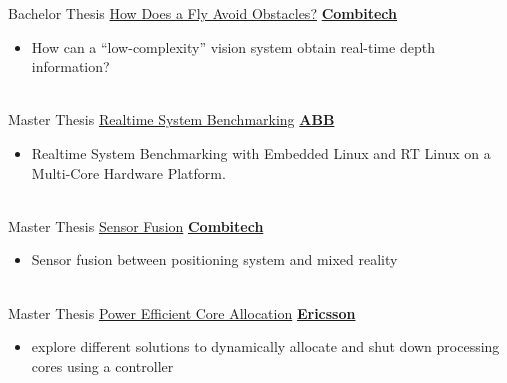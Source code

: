 \documentclass[letterpaper]{DS_class_file} %
\begin{document}
\begin{twenty} %
    
	\twentyitem
	{Bachelor}
	{Thesis}
    	{\hspace{0.3cm}\href{https://liu.diva-portal.org/smash/get/diva2:1678722/FULLTEXT01.pdf}{How Does a Fly Avoid Obstacles?}}
	{\href{https://www.combitech.se/}{\textbf{Combitech}}}
	{}
	{
		{\begin{itemize}
				\item How can a “low-complexity” vision system obtain real-time depth information?
		\end{itemize}}
	}
	\\
 \twentyitem
	{Master}
	{Thesis}
	{\hspace{0.3cm}\href{}{Realtime System Benchmarking}}
	{\href{https://new.abb.com/se/}{\textbf{ABB}}}
	{}
	{
		{\begin{itemize}
				\item Realtime System Benchmarking with Embedded Linux and RT Linux on a Multi-Core Hardware Platform.
		\end{itemize}}
	}
	\\

 \twentyitem
	{Master}
	{Thesis}
	{\hspace{0.3cm}\href{https://liu.diva-portal.org/smash/get/diva2:1709805/FULLTEXT01.pdf}{Sensor Fusion}}
	{\href{https://www.combitech.se/}{\textbf{Combitech}}}
	{}
	{
		{\begin{itemize}
				\item Sensor fusion between positioning system and mixed reality
		\end{itemize}}
	}
	\\

 \twentyitem
	{Master}
	{Thesis}
	{\hspace{0.3cm}\href{}{Power Efficient Core Allocation}}
	{\href{https://www.ericsson.com/en/about-us/company-facts/ericsson-worldwide/sweden/}{\textbf{Ericsson}}}
	{}
	{
		{\begin{itemize}
				\item explore different solutions to dynamically allocate and shut down processing cores using a controller
		\end{itemize}}
	}
	\\


\end{twenty}
\end{document}
